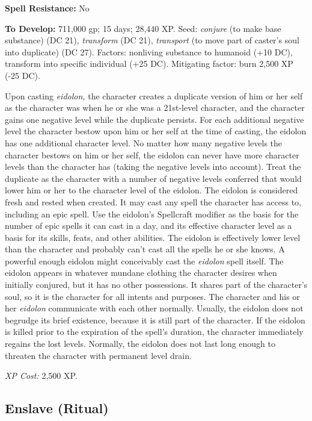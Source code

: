 \documentclass{article}
\begin{document}
\textbf{Spell Resistance:} No 

\textbf{To Develop:} 711,000 gp; 15 days; 28,440 XP. Seed: \textit{conjure }(to 
make base substance) (DC 21), \textit{transform }(DC 21), \textit{transport }(to 
move part of caster's soul into duplicate) (DC 27). Factors: nonliving substance 
to humanoid (+10 DC), transform into specific individual (+25 DC). Mitigating factor: 
burn 2,500 XP (-25 DC). 

Upon casting \textit{eidolon, }the character creates a duplicate version of him 
or her self as the character was when he or she was a 21st-level character, and 
the character gains one negative level while the duplicate persists. For each additional 
negative level the character bestow upon him or her self at the time of casting, 
the eidolon has one additional character level. No matter how many negative levels 
the character bestows on him or her self, the eidolon can never have more character 
levels than the character has (taking the negative levels into account). Treat 
the duplicate as the character with a number of negative levels conferred that 
would lower him or her to the character level of the eidolon. The eidolon is considered 
fresh and rested when created. It may cast any spell the character has access to, 
including an epic spell. Use the eidolon's Spellcraft modifier as the basis for 
the number of epic spells it can cast in a day, and its effective character level 
as a basis for its skills, feats, and other abilities. The eidolon is effectively 
lower level than the character and probably can't cast all the spells he or she 
knows. A powerful enough eidolon might conceivably cast the \textit{eidolon }spell 
itself. The eidolon appears in whatever mundane clothing the character desires 
when initially conjured, but it has no other possessions. It shares part of the 
character's soul, so it is the character for all intents and purposes. The character 
and his or her \textit{eidolon }communicate with each other normally. Usually, 
the eidolon does not begrudge its brief existence, because it is still part of 
the character. If the eidolon is killed prior to the expiration of the spell's 
duration, the character immediately regains the lost levels. Normally, the eidolon 
does not last long enough to threaten the character with permanent level drain. 

\textit{XP Cost: }2,500 XP. 

\vspace{12pt}
\subsection*{Enslave (Ritual)}
\end{document}
